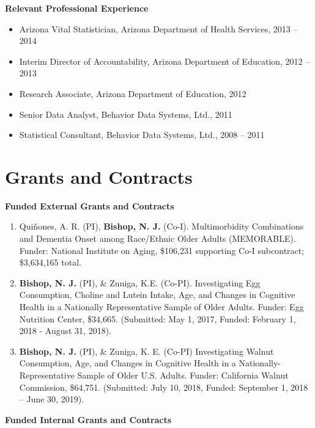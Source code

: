 \documentclass[
]{article}
\begin{document}
\textbf{Relevant Professional Experience}

\begin{itemize}
\item
  Arizona Vital Statistician, Arizona Department of Health Services,
  2013 -- 2014
\item
  Interim Director of Accountability, Arizona Department of Education,
  2012 -- 2013
\item
  Research Associate, Arizona Department of Education, 2012
\item
  Senior Data Analyst, Behavior Data Systems, Ltd., 2011
\item
  Statistical Consultant, Behavior Data Systems, Ltd., 2008 -- 2011
\end{itemize}

\hypertarget{grants-and-contracts}{%
\section{\texorpdfstring{\textbf{Grants and
Contracts}}{Grants and Contracts}}\label{grants-and-contracts}}

\textbf{Funded External Grants and Contracts}

\begin{enumerate}
\def\labelenumi{\arabic{enumi}.}
\item
  Quiñones, A. R. (PI), \textbf{Bishop, N. J.} (Co-I). Multimorbidity
  Combinations and Dementia Onset among Race/Ethnic Older Adults
  (MEMORABLE). Funder: National Institute on Aging, \$106,231 supporting
  Co-I subcontract; \$3,634,165 total.
\item
  \textbf{Bishop, N. J.} (PI), \& Zuniga, K.E. (Co-PI). Investigating
  Egg Consumption, Choline and Lutein Intake, Age, and Changes in
  Cognitive Health in a Nationally Representative Sample of Older
  Adults. Funder: Egg Nutrition Center, \$34,665. (Submitted: May 1,
  2017, Funded: February 1, 2018 - August 31, 2018).
\item
  \textbf{Bishop, N. J.} (PI), \& Zuniga, K. E. (Co-PI) Investigating
  Walnut Consumption, Age, and Changes in Cognitive Health in a
  Nationally-Representative Sample of Older U.S. Adults. Funder:
  California Walnut Commission, \$64,751. (Submitted: July 10, 2018,
  Funded: September 1, 2018 -- June 30, 2019).
\end{enumerate}

\textbf{Funded Internal Grants and Contracts}
\end{document}
